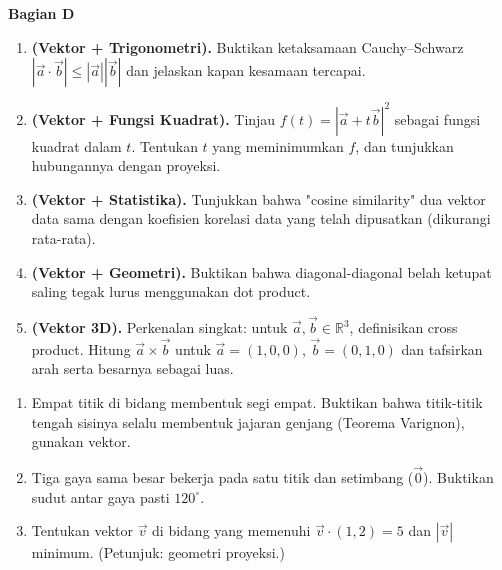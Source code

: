 \documentclass[11pt,a4paper]{report}
\theoremstyle{gaya}
\newcommand{\bagiansoal}[2]{%
  \par\medskip\noindent
  {\large\bfseries\color{biru}Bagian #1}\par\smallskip
  \addcontentsline{toc}{subsection}{Bagian #1}}
\begin{document}
\bagiansoal{D}{Expert (setara tahun pertama universitas --- sintesis antarbab)}
\begin{enumerate}[leftmargin=*]
  \item \textbf{(Vektor + Trigonometri).} Buktikan ketaksamaan Cauchy--Schwarz $|\vec a\cdot\vec b|\le|\vec a||\vec b|$ dan jelaskan kapan kesamaan tercapai.
  \item \textbf{(Vektor + Fungsi Kuadrat).} Tinjau $f(t)=|\vec a+t\vec b|^2$ sebagai fungsi kuadrat dalam $t$. Tentukan $t$ yang meminimumkan $f$, dan tunjukkan hubungannya dengan proyeksi.
  \item \textbf{(Vektor + Statistika).} Tunjukkan bahwa "cosine similarity" dua vektor data sama dengan koefisien korelasi data yang telah dipusatkan (dikurangi rata-rata).
  \item \textbf{(Vektor + Geometri).} Buktikan bahwa diagonal-diagonal belah ketupat saling tegak lurus menggunakan dot product.
  \item \textbf{(Vektor 3D).} Perkenalan singkat: untuk $\vec a,\vec b\in\mathbb R^3$, definisikan cross product. Hitung $\vec a\times\vec b$ untuk $\vec a=(1,0,0)$, $\vec b=(0,1,0)$ dan tafsirkan arah serta besarnya sebagai luas.
\end{enumerate}

\begin{challenge}
\begin{enumerate}[leftmargin=*,topsep=2pt]
  \item Empat titik di bidang membentuk segi empat. Buktikan bahwa titik-titik tengah sisinya selalu membentuk jajaran genjang (Teorema Varignon), gunakan vektor.
  \item Tiga gaya sama besar bekerja pada satu titik dan setimbang ($\vec0$). Buktikan sudut antar gaya pasti $120^\circ$.
  \item Tentukan vektor $\vec v$ di bidang yang memenuhi $\vec v\cdot(1,2)=5$ dan $|\vec v|$ minimum. (Petunjuk: geometri proyeksi.)
\end{enumerate}
\end{challenge}

\end{document}
